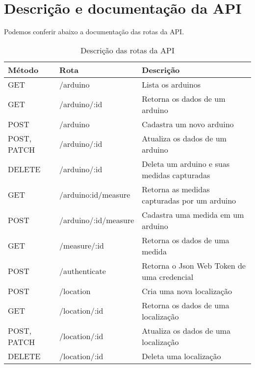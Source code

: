 \chapter{Descrição e documentação da API}

Podemos conferir abaixo a documentação das rotas da API.

\begin{table}[H]
    \centering
    \caption{Descrição das rotas da API}
    \label{table_api_routes}
    \begin{tabular}{|l|l|l|}
    \hline
    \textbf{Método} & \textbf{Rota}        & \textbf{Descrição}                           \\ \hline
    GET             & /arduino             & Lista os arduinos                            \\ \hline
    GET             & /arduino/:id         & Retorna os dados de um arduino               \\ \hline
    POST            & /arduino             & Cadastra um novo arduino                     \\ \hline
    POST, PATCH     & /arduino/:id         & Atualiza os dados de um arduino              \\ \hline
    DELETE          & /arduino/:id         & Deleta um arduino e suas medidas capturadas  \\ \hline
    GET             & /arduino:id/measure  & Retorna as medidas capturadas por um arduino \\ \hline
    POST            & /arduino/:id/measure & Cadastra uma medida em um arduino            \\ \hline
    GET             & /measure/:id         & Retorna os dados de uma medida               \\ \hline
    POST            & /authenticate        & Retorna o Json Web Token de uma credencial   \\ \hline
    POST            & /location            & Cria uma nova localização                    \\ \hline
    GET             & /location/:id        & Retorna os dados de uma localização          \\ \hline
    POST, PATCH     & /location/:id        & Atualiza os dados de uma localização         \\ \hline
    DELETE          & /location/:id        & Deleta uma localização                       \\ \hline

    \end{tabular}
\end{table}

